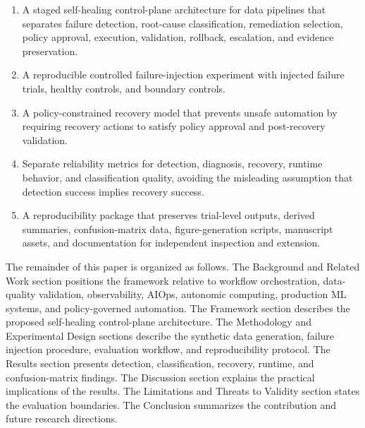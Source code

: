 \begin{enumerate}
\item A staged self-healing control-plane architecture for data pipelines that separates failure detection, root-cause classification, remediation selection, policy approval, execution, validation, rollback, escalation, and evidence preservation.
\item A reproducible controlled failure-injection experiment with injected failure trials, healthy controls, and boundary controls.
\item A policy-constrained recovery model that prevents unsafe automation by requiring recovery actions to satisfy policy approval and post-recovery validation.
\item Separate reliability metrics for detection, diagnosis, recovery, runtime behavior, and classification quality, avoiding the misleading assumption that detection success implies recovery success.
\item A reproducibility package that preserves trial-level outputs, derived summaries, confusion-matrix data, figure-generation scripts, manuscript assets, and documentation for independent inspection and extension.
\end{enumerate}

The remainder of this paper is organized as follows. The Background and Related Work section positions the framework relative to workflow orchestration, data-quality validation, observability, AIOps, autonomic computing, production ML systems, and policy-governed automation. The Framework section describes the proposed self-healing control-plane architecture. The Methodology and Experimental Design sections describe the synthetic data generation, failure injection procedure, evaluation workflow, and reproducibility protocol. The Results section presents detection, classification, recovery, runtime, and confusion-matrix findings. The Discussion section explains the practical implications of the results. The Limitations and Threats to Validity section states the evaluation boundaries. The Conclusion summarizes the contribution and future research directions.

